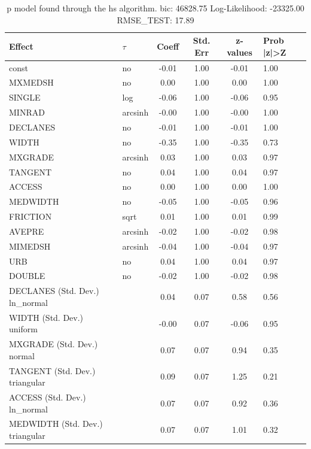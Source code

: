 \begin{table}
	\caption{p model found through the hs algorithm. bic: 46828.75 Log-Likelihood: -23325.00 RMSE_TEST: 17.89}
	\begin{center}
		\begin{tabular}{|l|l|c|c|c|l|}
			\hline
			Effect & $\tau$ & Coeff & Std. Err & z-values & Prob |z|>Z \\
			\hline
			const & no & -0.01 & 1.00 & -0.01 & 1.00 \\
			\hline
			MXMEDSH & no & 0.00 & 1.00 & 0.00 & 1.00 \\
			\hline
			SINGLE & log & -0.06 & 1.00 & -0.06 & 0.95 \\
			\hline
			MINRAD & arcsinh & -0.00 & 1.00 & -0.00 & 1.00 \\
			\hline
			DECLANES & no & -0.01 & 1.00 & -0.01 & 1.00 \\
			\hline
			WIDTH & no & -0.35 & 1.00 & -0.35 & 0.73 \\
			\hline
			MXGRADE & arcsinh & 0.03 & 1.00 & 0.03 & 0.97 \\
			\hline
			TANGENT & no & 0.04 & 1.00 & 0.04 & 0.97 \\
			\hline
			ACCESS & no & 0.00 & 1.00 & 0.00 & 1.00 \\
			\hline
			MEDWIDTH & no & -0.05 & 1.00 & -0.05 & 0.96 \\
			\hline
			FRICTION & sqrt & 0.01 & 1.00 & 0.01 & 0.99 \\
			\hline
			AVEPRE & arcsinh & -0.02 & 1.00 & -0.02 & 0.98 \\
			\hline
			MIMEDSH & arcsinh & -0.04 & 1.00 & -0.04 & 0.97 \\
			\hline
			URB & no & 0.04 & 1.00 & 0.04 & 0.97 \\
			\hline
			DOUBLE & no & -0.02 & 1.00 & -0.02 & 0.98 \\
			\hline
			DECLANES (Std. Dev.) ln_normal &  & 0.04 & 0.07 & 0.58 & 0.56 \\
			\hline
			WIDTH (Std. Dev.) uniform &  & -0.00 & 0.07 & -0.06 & 0.95 \\
			\hline
			MXGRADE (Std. Dev.) normal &  & 0.07 & 0.07 & 0.94 & 0.35 \\
			\hline
			TANGENT (Std. Dev.) triangular &  & 0.09 & 0.07 & 1.25 & 0.21 \\
			\hline
			ACCESS (Std. Dev.) ln_normal &  & 0.07 & 0.07 & 0.92 & 0.36 \\
			\hline
			MEDWIDTH (Std. Dev.) triangular &  & 0.07 & 0.07 & 1.01 & 0.32 \\
			\hline

\end{tabular}
\end{center}
\end{table}
